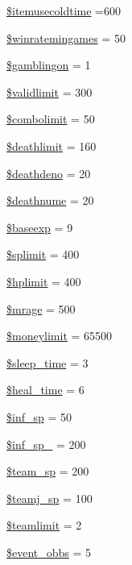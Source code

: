 \begin{DoxyCompactItemize}
\hyperlink{gamecfg__1_8php_a8ff81f5ce688c08dcf261ffa27fa0764}{\$itemusecoldtime} =600
\item 
\hyperlink{gamecfg__1_8php_a5154e0cf72d44a6cd3a3974dbd05bcf9}{\$winratemingames} = 50
\item 
\hyperlink{gamecfg__1_8php_ab3da51971e8638486cf5d6ca36c804b0}{\$gamblingon} = 1
\item 
\hyperlink{gamecfg__1_8php_a6cef405cbc58b7aca1af459df00ac50c}{\$validlimit} = 300
\item 
\hyperlink{gamecfg__1_8php_a07f60acd0b596786fcc385e2cfa1ca3d}{\$combolimit} = 50
\item 
\hyperlink{gamecfg__1_8php_aa436ad48c513c90b05fe82b37b67424e}{\$deathlimit} = 160
\item 
\hyperlink{gamecfg__1_8php_a1f004a4244505024ce471521d7172386}{\$deathdeno} = 20
\item 
\hyperlink{gamecfg__1_8php_aa9306e2b6ffa564c3d076cd29d2650dc}{\$deathnume} = 20
\item 
\hyperlink{gamecfg__1_8php_ae186f0eaca174601c88af42fb1accfb6}{\$baseexp} = 9
\item 
\hyperlink{gamecfg__1_8php_ad28374bc4466bb775d432260d548ffb3}{\$splimit} = 400
\item 
\hyperlink{gamecfg__1_8php_a70b943cda29c3eafca420a4ad2a8db5b}{\$hplimit} = 400
\item 
\hyperlink{gamecfg__1_8php_ab94e397fe60bbe8e7846a0463fcd759d}{\$mrage} = 500
\item 
\hyperlink{gamecfg__1_8php_a95757a9a9957cc6b45b689c9670236b1}{\$moneylimit} = 65500
\item 
\hyperlink{gamecfg__1_8php_a6f658227d708591f1e627bed425d5fe3}{\$sleep\+\_\+time} = 3
\item 
\hyperlink{gamecfg__1_8php_aa4695f36473eeaf50163ea29fdc918ab}{\$heal\+\_\+time} = 6
\item 
\hyperlink{gamecfg__1_8php_ad018a98e2b1be069c9d6427efdb07247}{\$inf\+\_\+sp} = 50
\item 
\hyperlink{gamecfg__1_8php_ad873d3b143c0a4744aee90f33c76ef9c}{\$inf\+\_\+sp\+\_} = 200
\item 
\hyperlink{gamecfg__1_8php_ad044b08a8aba2fc79d78b990297712e9}{\$team\+\_\+sp} = 200
\item 
\hyperlink{gamecfg__1_8php_ae84ddd27032dbca15c3b3b50455b7d15}{\$teamj\+\_\+sp} = 100
\item 
\hyperlink{gamecfg__1_8php_a35de88749c1c10aff2c721b63ba038f5}{\$teamlimit} = 2
\item 
\hyperlink{gamecfg__1_8php_ad937694bd38899ea72bd58d97d5e0cd3}{\$event\+\_\+obbs} = 5

\end{DoxyCompactItemize}
